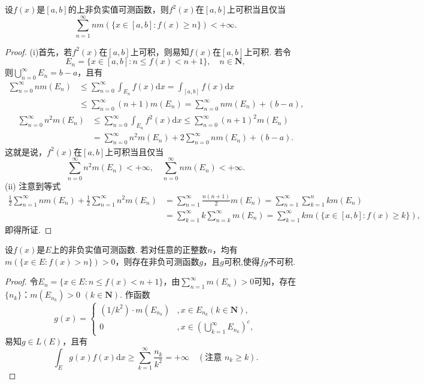 \documentclass[../../main.tex]{subfiles}
\begin{document}
\begin{example}
设\(f(x)\)是\([a, b]\)的上非负实值可测函数，则\(f^2(x)\)在\([a, b]\)上可积当且仅当
\[
\sum_{n = 1}^{\infty} n m(\{x \in [a, b]: f(x) \geqslant n\}) < +\infty.
\]
\end{example}
\begin{proof}
(i)首先，若\(f^2(x)\)在\([a, b]\)上可积，则易知\(f(x)\)在\([a, b]\)上可积. 若令
\[
E_n = \{x \in [a, b]: n \leqslant f(x) < n + 1\}, \quad n \in \mathbf{N},
\]
则\(\bigcup_{n = 0}^{\infty} E_n = b - a\)，且有
\begin{align*}
\sum_{n = 0}^{\infty} n m(E_n) &\leqslant \sum_{n = 0}^{\infty} \int_{E_n} f(x) \mathrm{d}x = \int_{[a, b]} f(x) \mathrm{d}x \\
&\leqslant \sum_{n = 0}^{\infty} (n + 1)m(E_n) = \sum_{n = 0}^{\infty} n m(E_n) + (b - a),
\end{align*}
\begin{align*}
\sum_{n = 0}^{\infty} n^2 m(E_n) &\leqslant \sum_{n = 0}^{\infty} \int_{E_n} f^2(x) \mathrm{d}x \leqslant \sum_{n = 0}^{\infty} (n + 1)^2 m(E_n) \\
&= \sum_{n = 0}^{\infty} n^2 m(E_n) + 2 \sum_{n = 0}^{\infty} n m(E_n) + (b - a).
\end{align*}
这就是说，\(f^2(x)\)在\([a, b]\)上可积当且仅当
\[
\sum_{n = 0}^{\infty} n^2 m(E_n) < +\infty, \quad \sum_{n = 0}^{\infty} n m(E_n) < +\infty.
\]
(ii) 注意到等式
\begin{align*}
\frac{1}{2} \sum_{n = 1}^{\infty} n m(E_n) + \frac{1}{2} \sum_{n = 1}^{\infty} n^2 m(E_n) 
&= \sum_{n = 1}^{\infty} \frac{n(n + 1)}{2} m(E_n) = \sum_{n = 1}^{\infty} \sum_{k = 1}^{n} k m(E_n) \\
&= \sum_{k = 1}^{\infty} k \sum_{n = k}^{\infty} m(E_n) = \sum_{k = 1}^{\infty} k m(\{x \in [a, b]: f(x) \geqslant k\}),
\end{align*}
即得所证.
\end{proof}

\begin{proposition}\label{proposition:4.1例7}
设\(f(x)\)是\(E\)上的非负实值可测函数. 若对任意的正整数\(n\)，均有\(m(\{x \in E: f(x)>n\})>0\)，则存在非负可测函数\(g\)，且$g$可积,使得\(fg\)不可积.
\end{proposition}
\begin{proof}
令\(E_n = \{x \in E: n \leqslant f(x) < n + 1\}\)，由\(\sum_{n = 1}^{\infty} m(E_n) > 0\)可知，存在\(\{n_k\}\)：\(m(E_{n_k})>0\) \((k \in \mathbf{N})\). 作函数
\[
g(x)=
\begin{cases}
(1 / k^2) \cdot m(E_{n_k}) &, x \in E_{n_k} (k \in \mathbf{N}), \\
0 & ,x \in \left(\bigcup_{k = 1}^{\infty} E_{n_k}\right)^c,
\end{cases}
\]
易知\(g \in L(E)\)，且有
\[
\int_E g(x) f(x) \mathrm{d}x \geqslant \sum_{k = 1}^{\infty} \frac{n_k}{k^2} = +\infty \quad (\text{注意 } n_k \geqslant k).
\] 
\end{proof}
\end{document}

